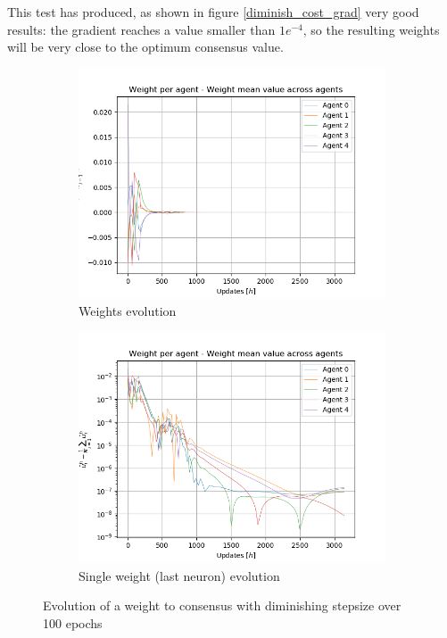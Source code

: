 \documentclass[a4paper,11pt,oneside]{book}
\begin{document}
This test has produced, as shown in figure \ref{diminish_cost_grad} very good results: the gradient reaches a value smaller than $1e^{-4}$, so the resulting weights will be very close to the optimum consensus value. 

\begin{figure}[h]
\centering
	\begin{subfigure}{0.49\textwidth}	
	\includegraphics[width=\textwidth]{diminishing/weight_100}
	\caption{Weights evolution}
	\end{subfigure}
\hfill
	\begin{subfigure}{0.49\textwidth}	
	\includegraphics[width=\textwidth]{diminishing/weight_100_log}
	\caption{Single weight (last neuron) evolution}
	\end{subfigure}
\caption{Evolution of a weight to consensus with diminishing stepsize over 100 epochs}
\label{diminish_weights}
\end{figure}
\bigskip
\end{document}
